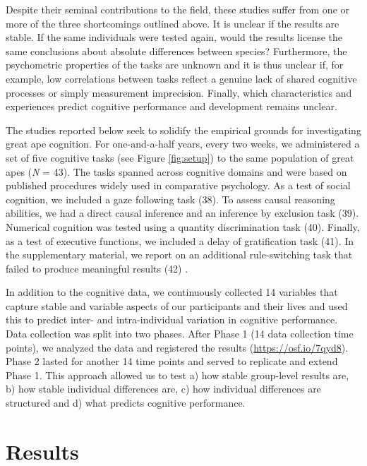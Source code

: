 \documentclass[
  man,floatsintext]{apa6}
\begin{document}
Despite their seminal contributions to the field, these studies suffer from one or more of the three shortcomings outlined above. It is unclear if the results are stable. If the same individuals were tested again, would the results license the same conclusions about absolute differences between species? Furthermore, the psychometric properties of the tasks are unknown and it is thus unclear if, for example, low correlations between tasks reflect a genuine lack of shared cognitive processes or simply measurement imprecision. Finally, which characteristics and experiences predict cognitive performance and development remains unclear.

The studies reported below seek to solidify the empirical grounds for investigating great ape cognition. For one-and-a-half years, every two weeks, we administered a set of five cognitive tasks (see Figure \ref{fig:setup}) to the same population of great apes (\emph{N} = 43). The tasks spanned across cognitive domains and were based on published procedures widely used in comparative psychology. As a test of social cognition, we included a gaze following task (38). To assess causal reasoning abilities, we had a direct causal inference and an inference by exclusion task (39). Numerical cognition was tested using a quantity discrimination task (40). Finally, as a test of executive functions, we included a delay of gratification task (41). In the supplementary material, we report on an additional rule-switching task that failed to produce meaningful results (42) .

In addition to the cognitive data, we continuously collected 14 variables that capture stable and variable aspects of our participants and their lives and used this to predict inter- and intra-individual variation in cognitive performance. Data collection was split into two phases. After Phase 1 (14 data collection time points), we analyzed the data and registered the results (\url{https://osf.io/7qyd8}). Phase 2 lasted for another 14 time points and served to replicate and extend Phase 1. This approach allowed us to test a) how stable group-level results are, b) how stable individual differences are, c) how individual differences are structured and d) what predicts cognitive performance.

\hypertarget{results}{%
\section{Results}\label{results}}
\end{document}

